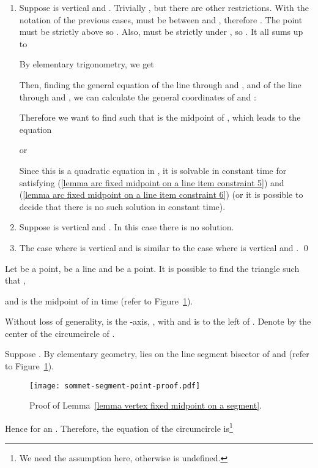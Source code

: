\documentclass[11pt, oneside]{article}
\begin{document}
\begin{enumerate}
\begin{enumerate}
\item[(3.1)] Suppose  is vertical and .
Trivially ,
but there are other restrictions.
With the notation of the previous cases,
 must be between  and ,
therefore .
The point  must be strictly above 
so .
Also,
 must be strictly under ,
so .
It all sums up to


By elementary trigonometry,
we get

Then,
finding the general equation of the line through  and ,
and of the line through  and ,
we can calculate the general coordinates of  and :

Therefore we want to find  such that
 is the midpoint of ,
which leads to the equation

or

Since this is a quadratic equation in ,
it is solvable in constant time 
for  satisfying (\ref{lemma arc fixed midpoint on a line item constraint 5})
and (\ref{lemma arc fixed midpoint on a line item constraint 6})
(or it is possible to decide 
that there is no such solution in constant time).

\item[(3.2)] Suppose  is vertical and .
In this case there is no solution.

\item[(3.3)] The case where  is vertical and 
is similar to the case where  is vertical and .
\qed
\end{enumerate}
\end{enumerate}


\begin{lemma}
\label{lemma vertex fixed midpoint on a segment}
Let  be a point,
 be a line
and  be a point.
It is possible to find the triangle 
such that ,

and  is the midpoint of 
in  time
(refer to Figure~\ref{sommet-segment-point-proof}).
\end{lemma}

\proof
Without loss of generality,
 is the -axis,
,
 with 
and  is to the left of .
Denote by 
the center of the circumcircle of .

Suppose .
By elementary geometry,
 lies on the line segment bisector of 
and 
(refer to Figure~\ref{sommet-segment-point-proof}).
\begin{figure}
\centering
\texttt{[image: sommet-segment-point-proof.pdf]}
\caption{Proof of Lemma~\ref{lemma vertex fixed midpoint on a segment}.\label{sommet-segment-point-proof}}
\end{figure}
Hence  for an .
Therefore,
the equation of the circumcircle is\footnote{We need
the assumption  here,
otherwise  is undefined.}
\end{document}
